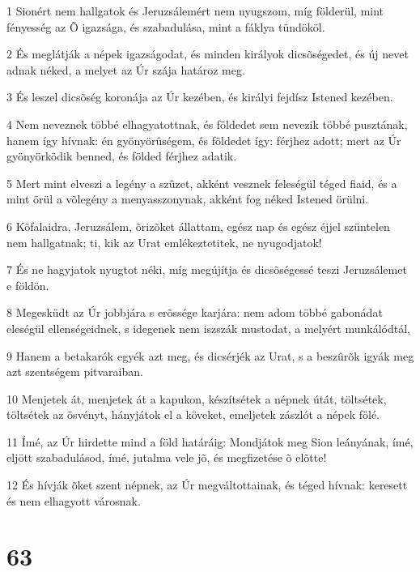 \par 1 Sionért nem hallgatok és Jeruzsálemért nem nyugszom, míg földerül, mint fényesség az Õ igazsága, és szabadulása, mint a fáklya tündököl.
\par 2 És meglátják a népek igazságodat, és minden királyok dicsõségedet, és új nevet adnak néked, a melyet az Úr szája határoz meg.
\par 3 És leszel dicsõség koronája az Úr kezében, és királyi fejdísz Istened kezében.
\par 4 Nem neveznek többé elhagyatottnak, és földedet sem nevezik többé pusztának, hanem így hívnak: én gyönyörûségem, és földedet így: férjhez adott; mert az Úr gyönyörködik benned, és földed férjhez adatik.
\par 5 Mert mint elveszi a legény a szûzet, akként vesznek feleségül téged fiaid, és a mint örül a võlegény a menyasszonynak, akként fog néked Istened örülni.
\par 6 Kõfalaidra, Jeruzsálem, õrizõket állattam, egész nap és egész éjjel szüntelen nem hallgatnak; ti, kik az Urat emlékeztetitek, ne nyugodjatok!
\par 7 És ne hagyjatok nyugtot néki, míg megújítja és dicsõségessé teszi Jeruzsálemet e földön.
\par 8 Megesküdt az Úr jobbjára s erõssége karjára: nem adom többé gabonádat eleségül ellenségeidnek, s idegenek nem iszszák mustodat, a melyért munkálódtál,
\par 9 Hanem a betakarók egyék azt meg, és dicsérjék az Urat, s a beszûrõk igyák meg azt szentségem pitvaraiban.
\par 10 Menjetek át, menjetek át a kapukon, készítsétek a népnek útát, töltsétek, töltsétek az ösvényt, hányjátok el a köveket, emeljetek zászlót a népek fölé.
\par 11 Ímé, az Úr hirdette mind a föld határáig: Mondjátok meg Sion leányának, ímé, eljött szabadulásod, ímé, jutalma vele jõ, és megfizetése õ elõtte!
\par 12 És hívják õket szent népnek, az Úr megváltottainak, és téged hívnak: keresett és nem elhagyott városnak.

\chapter{63}

